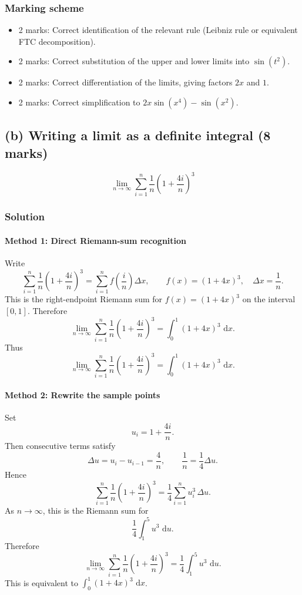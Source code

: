 \documentclass[12pt]{article}
\newcommand{\dd}{\,\mathrm{d}}
\begin{document}
\subsubsection{Marking scheme}
\begin{itemize}
\item 2 marks: Correct identification of the relevant rule (Leibniz rule or equivalent FTC decomposition).
\item 2 marks: Correct substitution of the upper and lower limits into \(\sin(t^2)\).
\item 2 marks: Correct differentiation of the limits, giving factors \(2x\) and \(1\).
\item 2 marks: Correct simplification to \(2x\sin(x^4)-\sin(x^2)\).
\end{itemize}

\newpage
\subsection{(b) Writing a limit as a definite integral \hfill (8 marks)}

\[
\lim_{n\to\infty}\sum_{i=1}^{n}\frac{1}{n}\left(1+\frac{4i}{n}\right)^3
\]

\subsubsection{Solution}

\paragraph{Method 1: Direct Riemann-sum recognition}
Write
\[
\sum_{i=1}^{n}\frac{1}{n}\left(1+\frac{4i}{n}\right)^3
=\sum_{i=1}^{n} f\!\left(\frac{i}{n}\right)\Delta x,
\qquad
f(x)=(1+4x)^3,\quad \Delta x=\frac{1}{n}.
\]
This is the right-endpoint Riemann sum for \(f(x)=(1+4x)^3\) on the interval \([0,1]\).
Therefore
\[
\lim_{n\to\infty}\sum_{i=1}^{n}\frac{1}{n}\left(1+\frac{4i}{n}\right)^3
=\int_0^1 (1+4x)^3\,\dd x.
\]
Thus
\[
\boxed{
\lim_{n\to\infty}\sum_{i=1}^{n}\frac{1}{n}\left(1+\frac{4i}{n}\right)^3
=\int_0^1 (1+4x)^3\,\dd x.
}
\]

\paragraph{Method 2: Rewrite the sample points}
Set
\[
u_i=1+\frac{4i}{n}.
\]
Then consecutive terms satisfy
\[
\Delta u=u_i-u_{i-1}=\frac{4}{n},
\qquad
\frac{1}{n}=\frac{1}{4}\Delta u.
\]
Hence
\[
\sum_{i=1}^{n}\frac{1}{n}\left(1+\frac{4i}{n}\right)^3
=\frac{1}{4}\sum_{i=1}^{n} u_i^3\,\Delta u.
\]
As \(n\to\infty\), this is the Riemann sum for
\[
\frac14\int_1^5 u^3\,\dd u.
\]
Therefore
\[
\boxed{
\lim_{n\to\infty}\sum_{i=1}^{n}\frac{1}{n}\left(1+\frac{4i}{n}\right)^3
=\frac14\int_1^5 u^3\,\dd u.
}
\]
This is equivalent to \(\int_0^1 (1+4x)^3\,\dd x\).
\end{document}
